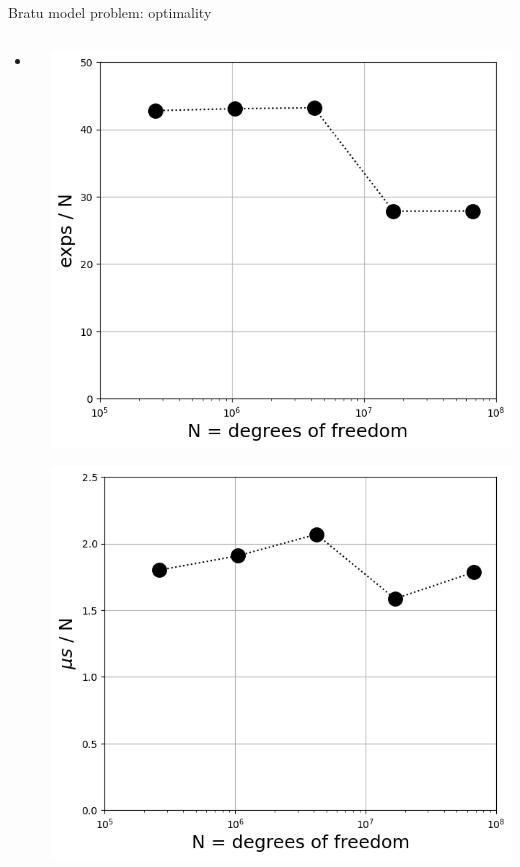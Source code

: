 \documentclass[svgnames,
               hyperref={colorlinks,citecolor=DeepPink4,linkcolor=FireBrick,urlcolor=Maroon},
               usepdftitle=false]  %
               {beamer}
\begin{document}
\begin{frame}{Bratu model problem: optimality}

\begin{columns}
\begin{column}{0.6\textwidth}
\begin{itemize}
\item x
\end{itemize}
\end{column}
\begin{column}{0.4\textwidth}
\includegraphics[width=\textwidth]{images/bratu-exps.png}

\includegraphics[width=\textwidth]{images/bratu-time.png}
\end{column}
\end{columns}
\end{frame}
\end{document}
